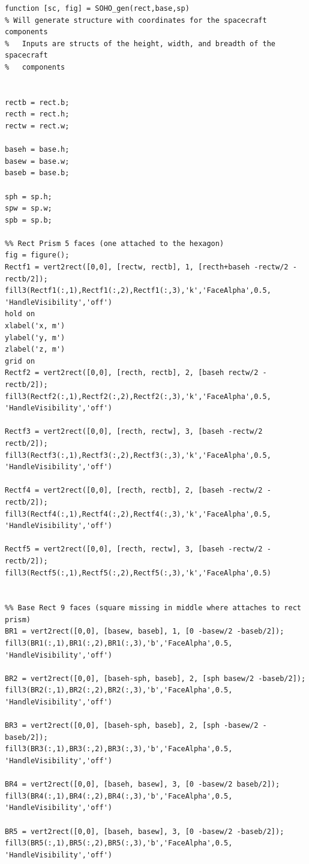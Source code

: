 \documentclass[12pt,a4paper,notitlepage]{article}
\begin{document}
\begin{lstlisting}
function [sc, fig] = SOHO_gen(rect,base,sp)
% Will generate structure with coordinates for the spacecraft components
%   Inputs are structs of the height, width, and breadth of the spacecraft
%   components


rectb = rect.b;
recth = rect.h;
rectw = rect.w;

baseh = base.h;
basew = base.w;
baseb = base.b;

sph = sp.h;
spw = sp.w;
spb = sp.b;

%% Rect Prism 5 faces (one attached to the hexagon)
fig = figure();
Rectf1 = vert2rect([0,0], [rectw, rectb], 1, [recth+baseh -rectw/2 -rectb/2]);
fill3(Rectf1(:,1),Rectf1(:,2),Rectf1(:,3),'k','FaceAlpha',0.5,
'HandleVisibility','off')
hold on
xlabel('x, m')
ylabel('y, m')
zlabel('z, m')
grid on
Rectf2 = vert2rect([0,0], [recth, rectb], 2, [baseh rectw/2 -rectb/2]);
fill3(Rectf2(:,1),Rectf2(:,2),Rectf2(:,3),'k','FaceAlpha',0.5,
'HandleVisibility','off')

Rectf3 = vert2rect([0,0], [recth, rectw], 3, [baseh -rectw/2 rectb/2]);
fill3(Rectf3(:,1),Rectf3(:,2),Rectf3(:,3),'k','FaceAlpha',0.5,
'HandleVisibility','off')

Rectf4 = vert2rect([0,0], [recth, rectb], 2, [baseh -rectw/2 -rectb/2]);
fill3(Rectf4(:,1),Rectf4(:,2),Rectf4(:,3),'k','FaceAlpha',0.5,
'HandleVisibility','off')

Rectf5 = vert2rect([0,0], [recth, rectw], 3, [baseh -rectw/2 -rectb/2]);
fill3(Rectf5(:,1),Rectf5(:,2),Rectf5(:,3),'k','FaceAlpha',0.5)


%% Base Rect 9 faces (square missing in middle where attaches to rect prism)
BR1 = vert2rect([0,0], [basew, baseb], 1, [0 -basew/2 -baseb/2]);
fill3(BR1(:,1),BR1(:,2),BR1(:,3),'b','FaceAlpha',0.5,
'HandleVisibility','off')

BR2 = vert2rect([0,0], [baseh-sph, baseb], 2, [sph basew/2 -baseb/2]);
fill3(BR2(:,1),BR2(:,2),BR2(:,3),'b','FaceAlpha',0.5,
'HandleVisibility','off')

BR3 = vert2rect([0,0], [baseh-sph, baseb], 2, [sph -basew/2 -baseb/2]);
fill3(BR3(:,1),BR3(:,2),BR3(:,3),'b','FaceAlpha',0.5,
'HandleVisibility','off')

BR4 = vert2rect([0,0], [baseh, basew], 3, [0 -basew/2 baseb/2]);
fill3(BR4(:,1),BR4(:,2),BR4(:,3),'b','FaceAlpha',0.5,
'HandleVisibility','off')

BR5 = vert2rect([0,0], [baseh, basew], 3, [0 -basew/2 -baseb/2]);
fill3(BR5(:,1),BR5(:,2),BR5(:,3),'b','FaceAlpha',0.5,
'HandleVisibility','off')


\end{lstlisting}
\end{document}
